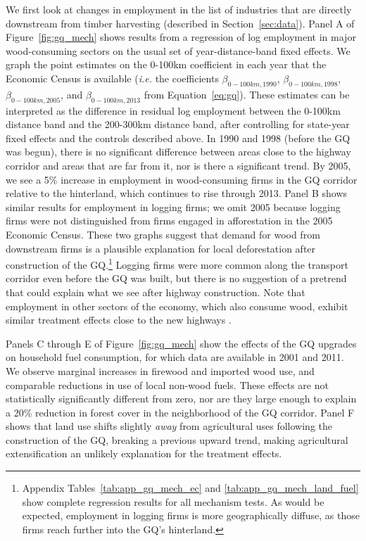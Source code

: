 We first look at changes in employment in the list of industries that
are directly downstream from timber harvesting (described in
Section~\ref{sec:data}). Panel A of Figure~\ref{fig:gq_mech} shows
results from a regression of log employment in major wood-consuming
sectors on the usual set of year-distance-band fixed effects. We graph
the point estimates on the 0-100km coefficient in each year that the
Economic Census is available (\textit{i.e.} the coefficients
$\beta_{0-100km,1990}$, $\beta_{0-100km,1998}$,
$\beta_{0-100km,2005}$, and $\beta_{0-100km,2013}$ from
Equation~\ref{eq:gq}). These estimates can be interpreted as the
difference in residual log employment between the 0-100km distance
band and the 200-300km distance band, after controlling for state-year
fixed effects and the controls described above. In 1990 and 1998
(before the GQ was begun), there is no significant difference between
areas close to the highway corridor and areas that are far from it,
nor is there a significant trend. By 2005, we see a 5\% increase in
employment in wood-consuming firms in the GQ corridor relative to the
hinterland, which continues to rise through 2013. Panel B shows
similar results for employment in logging firms; we omit 2005 because
logging firms were not distinguished from firms engaged in
afforestation in the 2005 Economic Census.  These two graphs suggest
that demand for wood from downstream firms is a plausible explanation
for local deforestation after construction of the
GQ.\footnote{Appendix Tables~\ref{tab:app_gq_mech_ec} and
  \ref{tab:app_gq_mech_land_fuel} show complete regression results for
  all mechanism tests. As would be expected, employment in logging
  firms is more geographically diffuse, as those firms reach further
  into the GQ's hinterland.} Logging firms were more common
along the transport corridor even before the GQ was built, but there
is no suggestion of a pretrend that could explain what we see after
highway construction. Note that employment in other sectors of the
economy, which also consume wood, exhibit similar treatment effects
close to the new highways \cite{GGK16}.

Panels C through E of Figure~\ref{fig:gq_mech} show the effects of the
GQ upgrades on household fuel consumption, for which data are
available in 2001 and 2011. We observe marginal increases in firewood
and imported wood use, and comparable reductions in use of local
non-wood fuels. These effects are not statistically significantly
different from zero, nor are they large enough to explain a 20\%
reduction in forest cover in the neighborhood of the GQ
corridor. Panel F shows that land use shifts slightly \textit{away}
from agricultural uses following the construction of the GQ, breaking
a previous upward trend, making agricultural extensification an
unlikely explanation for the treatment effects.

